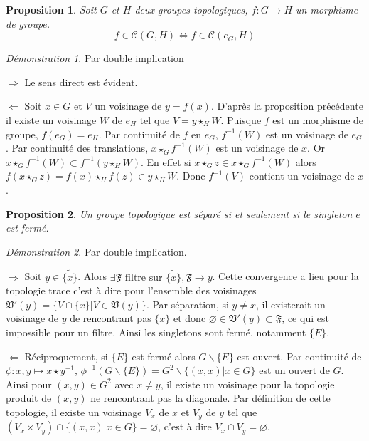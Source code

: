 \documentclass[a4paper, 11pt, french]{book}
\newenvironment{itemise}{\itemize}{\enditemize}
\theoremstyle{plain} %
\newtheorem{proposition}{Proposition}
\theoremstyle{definition} %
\theoremstyle{remark} %
\newtheorem*{demonstration}{Démonstration}
\renewcommand{\setminus}{\backslash}
\newcommand{\1}{\mathds{1}}
\newcommand\vide{\varnothing}
\newcommand{\cont}{\mathcal{C}}
\newcommand{\inv}[1]{#1^{-1}}
\begin{document}
\begin{proposition}
	Soit $G$ et $H$ deux groupes topologiques, $f:G\rightarrow H$ un morphisme de groupe.
	$$
		f\in\cont(G, H)\iff f\in\cont(e_G, H)
	$$
\end{proposition}

\begin{demonstration}
	Par double implication
	\begin{itemise}
		\item[$\Rightarrow$] Le sens direct est évident.
		\item[$\Leftarrow$] Soit $x\in G$ et $V$ un voisinage de $y=f(x)$.
		D'après la proposition précédente il existe un voisinage $W$ de $e_H$ tel que $V=y\star_HW$.
		Puisque $f$ est un morphisme de groupe, $f(e_G)=e_H$.
		Par continuité de $f$ en $e_G$, $\inv{f}(W)$ est un voisinage de $e_G$.
		Par continuité des translations, $x\star_G\inv{f}(W)$ est un voisinage de $x$.
		Or $x\star_G\inv{f}(W)\subset\inv{f}(y\star_HW)$.
		En effet si $x\star_Gz\in x\star_G\inv{f}(W)$ alors $f(x\star_Gz)=f(x)\star_Hf(z)\in y\star_HW$.
		Donc $\inv{f}(V)$ contient un voisinage de $x$.
	\end{itemise}
\end{demonstration}

\begin{proposition}
	Un groupe topologique est séparé si et seulement si le singleton ${e}$ est fermé.
\end{proposition}

\begin{demonstration}
	Par double implication.
	\begin{itemise}
		\item[$\Rightarrow$] Soit $y\in\widetilde{\{x\}}$.
		Alors $\exists\mathfrak{F}\text{ filtre sur $\widetilde{\{x\}}$}, \mathfrak{F}\rightarrow y$.
		Cette convergence a lieu pour la topologie trace c'est à dire pour l'ensemble des voisinages $\mathfrak{V}'(y)=\{V\cap\{x\}|V\in\mathfrak{V}(y)\}$.
		Par séparation, si $y\neq x$, il existerait un voisinage de $y$ de rencontrant pas $\{x\}$ et donc $\vide\in\mathfrak{V}'(y)\subset\mathfrak{F}$, ce qui est impossible pour un filtre.
		Ainsi les singletons sont fermé, notamment $\{E\}$.
		\item[$\Leftarrow$] Réciproquement, si $\{E\}$ est fermé alors $G\setminus\{E\}$ est ouvert.
		Par continuité de $\phi:x, y\longmapsto x\star\inv{y}$, $\inv{\phi}(G\setminus\{E\})=G^2\setminus\{(x, x)|x\in G\}$ est un ouvert de $G$.
		Ainsi pour $(x, y)\in G^2$ avec $x\neq y$, il existe un voisinage pour la topologie produit de $(x, y)$ ne rencontrant pas la diagonale.
		Par définition de cette topologie, il existe un voisinage $V_x$ de $x$ et $V_y$ de $y$ tel que $(V_x\times V_y)\cap\{(x, x)|x\in G\}=\vide$, c'est à dire $V_x\cap V_y=\vide$.
	\end{itemise}
\end{demonstration}
\end{document}
